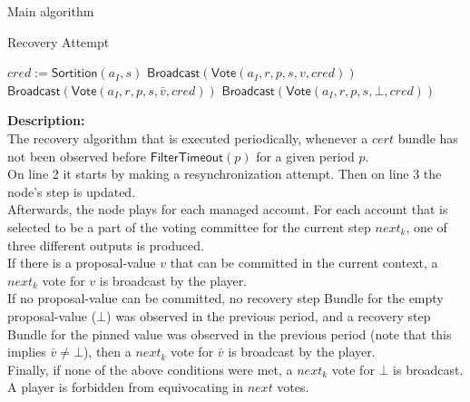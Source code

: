 \documentclass[10pt,a4paper]{article}
\begin{document}
\begin{section}{Main algorithm}
\begin{subsection}{Recovery Attempt}
\begin{algorithm}[H]
\begin{algorithmic}[1]
            \State $cred := \mathsf{\mathsf{Sortition}}(a_{I}, s)$
                    \State $\mathsf{Broadcast}(\mathsf{Vote}(a_I, r, p, s, v, cred))$
                    \State $\mathsf{Broadcast}(\mathsf{Vote}(a_I, r, p, s, \bar{v}, cred))$
                \Else
                    \State $\mathsf{Broadcast}(\mathsf{Vote}(a_I, r, p, s, \bot, cred))$
                \EndIf
            \EndIf
        \EndFor
        \EndFunction
        \end{algorithmic}
    \end{algorithm}
    
    
    \noindent \textbf{Description:}\\
The recovery algorithm that is executed periodically,
whenever a $cert$ bundle has not been observed before $\mathsf{FilterTimeout}(p)$ for a given period $p$. \\
On line 2 it starts by making a resynchronization attempt. Then on line 3 the node's step is updated.\\
Afterwards, the node plays for each managed account. For each account that is selected to be a part of the voting committee for the current
step $next_k$, one of three different outputs is produced. \\
If there is a proposal-value $v$ that can be committed in the current context, a $next_k$ vote for $v$ is broadcast by the player. \\
If no proposal-value can be committed, no recovery step Bundle for the empty proposal-value ($\bot$) was observed in the 
previous period, and a recovery step Bundle for the pinned value was observed in the previous period (note that this implies $\bar{v} \neq \bot$),
then a $next_k$ vote for $\bar{v}$ is broadcast by the player. \\
Finally, if none of the above conditions were met, a $next_k$ vote for $\bot$ is broadcast. A player is forbidden
from equivocating in $next$ votes.

\end{subsection}



\end{section}
\end{document}
